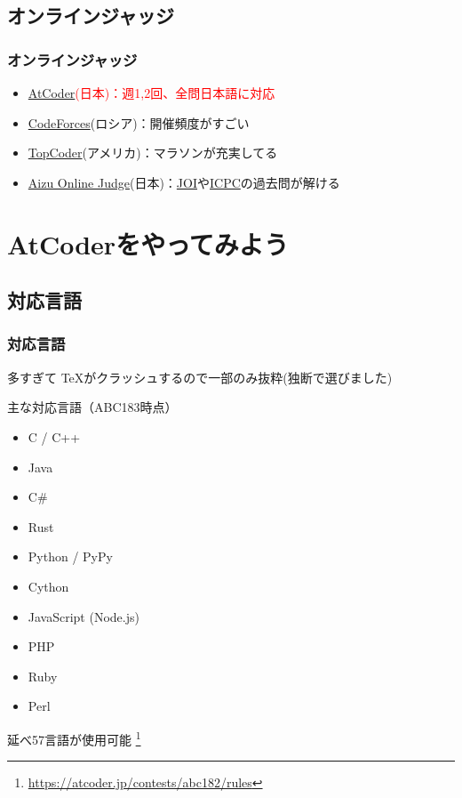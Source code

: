\documentclass[t, aspectratio=169, dvipdfmx]{beamer}
\begin{document}
\subsection{オンラインジャッジ}
\begin{frame}
  \frametitle{オンラインジャッジ}
  \begin{itemize}
    \item \textcolor{red}{\href{https://atcoder.jp/home}{AtCoder}(日本)：週1,2回、全問日本語に対応}
    \item \href{http://codeforces.com/}{CodeForces}(ロシア)：開催頻度がすごい
    \item \href{https://www.tc3.co.jp/topcodersrm/}{TopCoder}(アメリカ)：マラソンが充実してる
    \item \href{http://judge.u-aizu.ac.jp/onlinejudge/}{Aizu Online Judge}(日本)：\href{https://www.ioi-jp.org/}{JOI}や\href{https://icpc.iisf.or.jp/}{ICPC}の過去問が解ける
  \end{itemize}
\end{frame}

\section{AtCoderをやってみよう}
\frame{\sectionpage}

\subsection{対応言語}
\begin{frame}
  \frametitle{対応言語}
  多すぎて \TeX がクラッシュするので一部のみ抜粋(独断で選びました)
  \begin{block}{主な対応言語（ABC183時点）}
    \begin{multicols}{2}
      \begin{itemize}
        \item C / C++
        \item Java
        \item C\#
        \item Rust
        \item Python / PyPy
        \item Cython
        \item JavaScript (Node.js)
        \item PHP
        \item Ruby
        \item Perl
      \end{itemize}
    \end{multicols}
    延べ57言語が使用可能
    \footnote{\url{https://atcoder.jp/contests/abc182/rules}}
  \end{block}
\end{frame}
\end{document}
